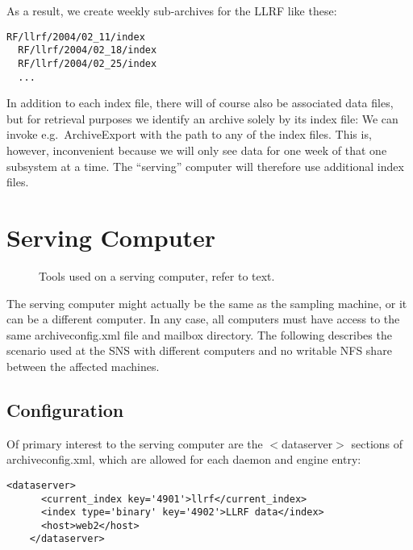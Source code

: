 \noindent As a result, we create weekly sub-archives for the LLRF like these:
\begin{lstlisting}[frame=none,keywordstyle=\sffamily]
  RF/llrf/2004/02_11/index
  RF/llrf/2004/02_18/index
  RF/llrf/2004/02_25/index
  ...
\end{lstlisting}
\noindent In addition to each index file, there will of course also be
associated data files, but for retrieval purposes we identify an
archive solely by its index file: We can invoke e.g.\ ArchiveExport
with the path to any of the index files. This is, however,
inconvenient because we will only see data for one week of that one
subsystem at a time.
The ``serving'' computer will therefore use additional index files.

\section{Serving Computer}  \label{sec:exampleServe}
\begin{figure}[htb]
\begin{center}
\end{center}
\caption{\label{fig:acServe}Tools used on a serving computer, refer to text.}
\end{figure}

\noindent The serving computer might actually be the same as the
sampling machine, or it can be a different computer. In any case, all
computers must have access to the same archiveconfig.xml file and
mailbox directory.
The following describes the scenario used at the SNS with 
different computers and no writable NFS share between the
affected machines.

\subsection{Configuration}
Of primary interest to the serving computer are the $<$dataserver$>$
sections of archiveconfig.xml, which are allowed for each daemon and
engine entry:

\begin{lstlisting}[frame=none,keywordstyle=\sffamily]
    <dataserver>
      <current_index key='4901'>llrf</current_index>
      <index type='binary' key='4902'>LLRF data</index>
      <host>web2</host>
    </dataserver>
\end{lstlisting}


